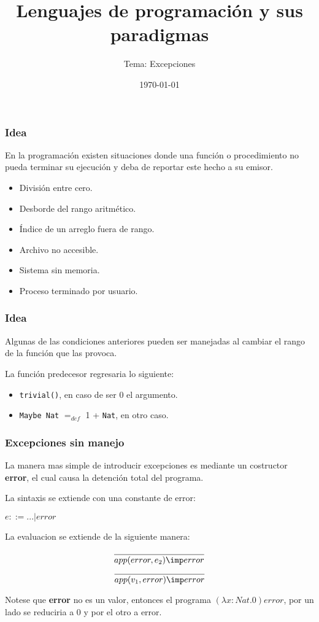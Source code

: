 \documentclass[xcolor=dvipsnames,table,spanish]{beamer}
\title[]{Lenguajes de programación y sus paradigmas}
\subtitle{Tema: Excepciones}
\author[]{}
\institute[UNAM-FC]{Facultad de Ciencias\\
Universidad Nacional Aut\'onoma de M\'exico}
\date[]{\small{\today}
\newline{\tiny{Material desarrollado bajo el proyecto UNAM-PAPIME PE102117.}}}
\begin{document}
\frame{\titlepage}

\begin{frame}
  \frametitle{Idea}
	En la programación existen situaciones donde una función o 		procedimiento no pueda terminar su ejecución y deba de 			reportar este hecho a su emisor.

	\begin{examples}
	\begin{itemize}
		\item División entre cero.
		\item Desborde del rango aritmético.
		\item Índice de un arreglo fuera de rango.
        \item Archivo no accesible.
        \item Sistema sin memoria.
        \item Proceso terminado por usuario.
	\end{itemize}
    \end{examples}
\end{frame}

\begin{frame}
  \frametitle{Idea}
	Algunas de las condiciones anteriores pueden ser manejadas al cambiar el rango de la función que las provoca.

  	\begin{example}
    La función predecesor regresaria lo siguiente:\newline
    \begin{itemize}
        \item \texttt{trivial()}, en caso de ser 0 el argumento.\newline
  	    \item \texttt{Maybe Nat} $=_{def}$ 1 + \texttt{Nat}, en otro caso.
    \end{itemize}
  	\end{example}

\end{frame}

\begin{frame}
  \frametitle{Excepciones sin manejo}
  La manera mas simple de introducir excepciones es mediante un costructor \textbf{error}, el cual causa la detención total del programa.\newline

  La sintaxis se extiende con una constante de error:
  \begin{center}
      $e::=...|error$
  \end{center}
  La evaluacion se extiende de la siguiente manera:
  \begin{center}
      \begin{equation*}
         \frac{}{app(error,e_2)\imp error}
	  \end{equation*}
      \begin{equation*}
         \frac{}{app(v_1,error)\imp error}
	  \end{equation*}
  \end{center}
Notese que \textbf{error} no es un valor, entonces el programa $(\lambda x: Nat.0)error$, por un lado se reduciria a 0 y por el otro a error.
\end{frame}
\end{document}
